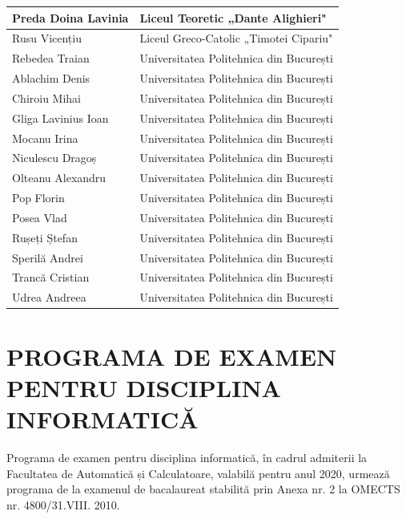 \documentclass[10pt]{article}
\begin{document}
\begin{center}
\begin{tabular}{|l|l|}
\hline
Preda Doina Lavinia & Liceul Teoretic „Dante Alighieri" \\
\hline
Rusu Vicențiu & Liceul Greco-Catolic „Timotei Cipariu" \\
\hline
Rebedea Traian & Universitatea Politehnica din București \\
\hline
Ablachim Denis & Universitatea Politehnica din București \\
\hline
Chiroiu Mihai & Universitatea Politehnica din București \\
\hline
Gliga Lavinius Ioan & Universitatea Politehnica din București \\
\hline
Mocanu Irina & Universitatea Politehnica din București \\
\hline
Niculescu Dragoș & Universitatea Politehnica din București \\
\hline
Olteanu Alexandru & Universitatea Politehnica din București \\
\hline
Pop Florin & Universitatea Politehnica din București \\
\hline
Posea Vlad & Universitatea Politehnica din București \\
\hline
Rușeți Ștefan & Universitatea Politehnica din București \\
\hline
Sperilă Andrei & Universitatea Politehnica din București \\
\hline
Trancă Cristian & Universitatea Politehnica din București \\
\hline
Udrea Andreea & Universitatea Politehnica din București \\
\hline
\end{tabular}
\end{center}

\section*{PROGRAMA DE EXAMEN PENTRU DISCIPLINA INFORMATICĂ}
Programa de examen pentru disciplina informatică, în cadrul admiterii la Facultatea de Automatică și Calculatoare, valabilă pentru anul 2020, urmează programa de la examenul de bacalaureat stabilită prin Anexa nr. 2 la OMECTS nr. 4800/31.VIII. 2010.
\end{document}
